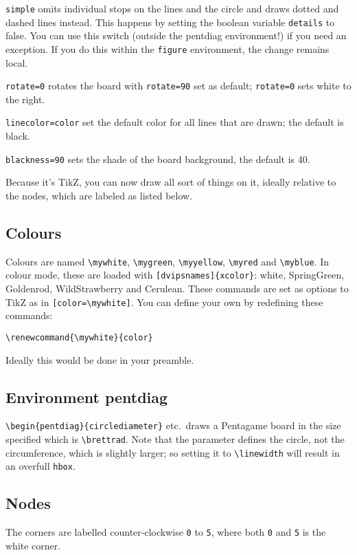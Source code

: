 \documentclass[a5paper]{scrartcl}
\begin{document}
\verb|simple| omits individual stops on the lines and the circle and draws dotted and dashed lines instead. This happens by setting the boolean variable \verb|details| to false. You can use this switch (outside the pentdiag environment!) if you need an exception. If you do this within the \verb|figure| environment, the change remains local.
    
\verb|rotate=0| rotates the board with \verb|rotate=90| set as default; \verb|rotate=0| sets white to the right.
    
\verb|linecolor=color| set the default color for all lines that are drawn; the default is black. 
    
\verb|blackness=90| sets the shade of the board background, the default is 40.

Because it's TikZ, you can now draw all sort of things on it, ideally relative to the nodes, which are labeled as listed below.

\subsection*{Colours}

Colours are named \verb|\mywhite|, \verb|\mygreen|, \verb|\myyellow|, \verb|\myred| and \verb|\myblue|. In colour mode, these are loaded with \verb|[dvipsnames]{xcolor}|: white, SpringGreen, Goldenrod, WildStrawberry and Cerulean. These commands are set as options to TikZ as in \verb|[color=\mywhite]|. You can define your own by redefining these commands:

\verb|\renewcommand{\mywhite}{color}|

Ideally this would be done in your preamble.


\subsection*{Environment pentdiag}

\verb|\begin{pentdiag}{circlediameter}| etc.~draws a Pentagame board in the size specified which is \verb|\brettrad|. Note that the parameter defines the circle, not the circumference, which is slightly larger; so setting it to \verb|\linewidth| will result in an overfull \verb|hbox|.

\subsection*{Nodes}

The corners are labelled counter-clockwise \verb|0| to \verb|5|, where both \verb|0| and \verb|5| is the white corner.  
\end{document}

